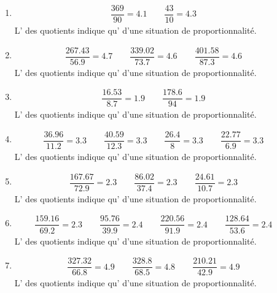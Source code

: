 {\begin{enumerate}
\item\begin{align*}
\dfrac{369}{90} = 4.1\qquad \dfrac{43}{10} = 4.3\qquad 
\end{align*}
L' des quotients indique qu' d'une situation de proportionnalité.

\item\begin{align*}
\dfrac{267.43}{56.9} = 4.7\qquad \dfrac{339.02}{73.7} = 4.6\qquad \dfrac{401.58}{87.3} = 4.6\qquad 
\end{align*}
L' des quotients indique qu' d'une situation de proportionnalité.

\item\begin{align*}
\dfrac{16.53}{8.7} = 1.9\qquad \dfrac{178.6}{94} = 1.9\qquad 
\end{align*}
L' des quotients indique qu' d'une situation de proportionnalité.

\item\begin{align*}
\dfrac{36.96}{11.2} = 3.3\qquad \dfrac{40.59}{12.3} = 3.3\qquad \dfrac{26.4}{8} = 3.3\qquad \dfrac{22.77}{6.9} = 3.3\qquad 
\end{align*}
L' des quotients indique qu' d'une situation de proportionnalité.

\item\begin{align*}
\dfrac{167.67}{72.9} = 2.3\qquad \dfrac{86.02}{37.4} = 2.3\qquad \dfrac{24.61}{10.7} = 2.3\qquad 
\end{align*}
L' des quotients indique qu' d'une situation de proportionnalité.

\item\begin{align*}
\dfrac{159.16}{69.2} = 2.3\qquad \dfrac{95.76}{39.9} = 2.4\qquad \dfrac{220.56}{91.9} = 2.4\qquad \dfrac{128.64}{53.6} = 2.4\qquad 
\end{align*}
L' des quotients indique qu' d'une situation de proportionnalité.

\item\begin{align*}
\dfrac{327.32}{66.8} = 4.9\qquad \dfrac{328.8}{68.5} = 4.8\qquad \dfrac{210.21}{42.9} = 4.9\qquad 
\end{align*}
L' des quotients indique qu' d'une situation de proportionnalité.


\end{enumerate}}
